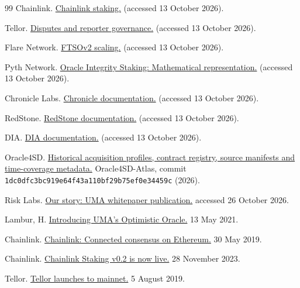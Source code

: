 \begin{thebibliography}{99}
Chainlink.
\href{https://chain.link/economics/staking}{Chainlink staking.}
(accessed 13 October 2026).

Tellor.
\href{https://docs.tellor.io/tellor/running-tellor/disputes-and-reporter-governance}{Disputes and reporter governance.}
(accessed 13 October 2026).

Flare Network.
\href{https://dev.flare.network/ftso/scaling/overview}{FTSOv2 scaling.}
(accessed 13 October 2026).

Pyth Network.
\href{https://docs.pyth.network/oracle-integrity-staking/mathematical-representation}{Oracle Integrity Staking: Mathematical representation.}
(accessed 13 October 2026).

Chronicle Labs.
\href{https://docs.chroniclelabs.org/}{Chronicle documentation.}
(accessed 13 October 2026).

RedStone.
\href{https://docs.redstone.finance/}{RedStone documentation.}
(accessed 13 October 2026).

DIA.
\href{https://www.diadata.org/docs/home}{DIA documentation.}
(accessed 13 October 2026).


Oracle4SD.
\href{https://github.com/Oracle4CEG/Oracle4SD-Atlas/tree/1dc0dfc3bc919e64f43a110bf29b75ef0e34459c/metadata}{Historical acquisition profiles, contract registry, source manifests and time-coverage metadata.}
Oracle4SD-Atlas, commit \texttt{1dc0dfc3bc919e64f43a110bf29b75ef0e34459c} (2026).


Risk Labs.
\href{https://risklabs.foundation/}{Our story: UMA whitepaper publication.}
accessed 26 October 2026.


Lambur, H.
\href{https://medium.com/uma-project/introducing-umas-optimistic-oracle-d92ce5d1a4bc}{Introducing UMA's Optimistic Oracle.}
13 May 2021.


Chainlink.
\href{https://chain.link/blog/chainlink-connected-consensus-on-ethereum}{Chainlink: Connected consensus on Ethereum.}
30 May 2019.


Chainlink.
\href{https://chain.link/blog/chainlink-staking-v0-2-now-live}{Chainlink Staking v0.2 is now live.}
28 November 2023.


Tellor.
\href{https://tellor.io/tellor-launches-to-mainnet/}{Tellor launches to mainnet.}
5 August 2019.



\end{thebibliography}
